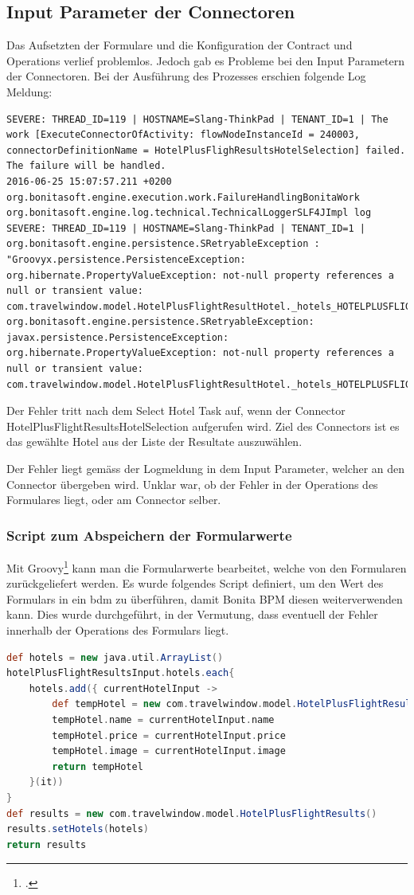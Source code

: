 \subsection{Input Parameter der Connectoren}
Das Aufsetzten der Formulare und die Konfiguration der Contract und Operations verlief problemlos. Jedoch gab es Probleme bei den Input Parametern der Connectoren. Bei der Ausführung des Prozesses erschien folgende Log Meldung:

\begin{lstlisting}[firstnumber=1]
SEVERE: THREAD_ID=119 | HOSTNAME=Slang-ThinkPad | TENANT_ID=1 | The work [ExecuteConnectorOfActivity: flowNodeInstanceId = 240003, connectorDefinitionName = HotelPlusFlighResultsHotelSelection] failed. The failure will be handled.
2016-06-25 15:07:57.211 +0200 org.bonitasoft.engine.execution.work.FailureHandlingBonitaWork org.bonitasoft.engine.log.technical.TechnicalLoggerSLF4JImpl log 
SEVERE: THREAD_ID=119 | HOSTNAME=Slang-ThinkPad | TENANT_ID=1 | org.bonitasoft.engine.persistence.SRetryableException : "Groovyx.persistence.PersistenceException: org.hibernate.PropertyValueException: not-null property references a null or transient value: com.travelwindow.model.HotelPlusFlightResultHotel._hotels_HOTELPLUSFLIGHTRESULTS_PIDBackref"
org.bonitasoft.engine.persistence.SRetryableException: javax.persistence.PersistenceException: org.hibernate.PropertyValueException: not-null property references a null or transient value: com.travelwindow.model.HotelPlusFlightResultHotel._hotels_HOTELPLUSFLIGHTRESULTS_PIDBackref
\end{lstlisting}

Der Fehler tritt nach dem Select Hotel Task auf, wenn der Connector HotelPlusFlightResultsHotelSelection aufgerufen wird. Ziel des Connectors ist es das gewählte Hotel aus der Liste der Resultate auszuwählen.

Der Fehler liegt gemäss der Logmeldung in dem Input Parameter, welcher an den Connector übergeben wird.
Unklar war, ob der Fehler in der Operations des Formulares liegt, oder am Connector selber.

\subsubsection{Script zum Abspeichern der Formularwerte}
Mit Groovy\footcite{Groovy_2016-06-25} kann man die Formularwerte bearbeitet, welche von den Formularen zurückgeliefert werden.
Es wurde folgendes Script definiert, um den Wert des Formulars in ein \gls{bdm} zu überführen, damit Bonita BPM diesen weiterverwenden kann. Dies wurde durchgeführt, in der Vermutung, dass eventuell der Fehler innerhalb der Operations des Formulars liegt.
\begin{lstlisting}[language=Groovy,firstnumber=1]
def hotels = new java.util.ArrayList()
hotelPlusFlightResultsInput.hotels.each{
	hotels.add({ currentHotelInput ->
		def tempHotel = new com.travelwindow.model.HotelPlusFlightResultHotel()
		tempHotel.name = currentHotelInput.name
		tempHotel.price = currentHotelInput.price
		tempHotel.image = currentHotelInput.image
		return tempHotel
	}(it))
}
def results = new com.travelwindow.model.HotelPlusFlightResults()
results.setHotels(hotels)
return results
\end{lstlisting}

